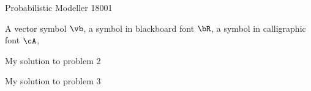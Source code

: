 \documentclass[a4paper,11pt]{article}
\begin{document}
{Probabilistic Modeller}   %
{18001}	%

\begin{pmisolution}

A vector symbol $\vb$, a symbol in blackboard font $\bR$, a symbol in calligraphic font $\cA$,   


\end{pmisolution}

\begin{pmisolution} 

My solution to problem 2


\end{pmisolution}

\begin{pmisolution}

My solution to problem 3

\end{pmisolution}
\end{document}
